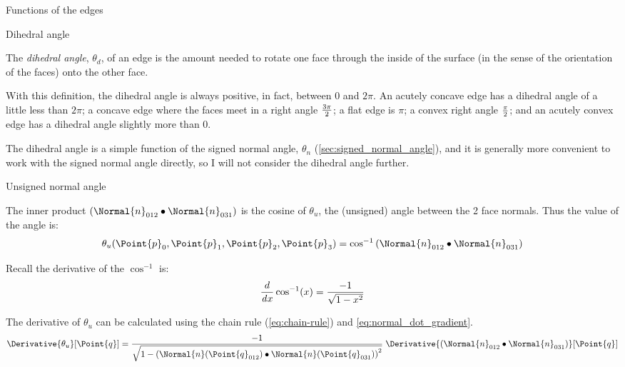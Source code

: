 \begin{plSection}{Functions of the edges}
\begin{plSection}{Dihedral angle}
\label{sec:Dihedral-angle}

The {\it dihedral angle},
$\theta_d$,
 of an edge is the amount
needed to rotate one face
through the inside of the surface
(in the sense of the orientation of the faces)
onto the other face.

With this definition, the dihedral angle is always
positive, in fact, between $0$ and $2\pi$.
An acutely concave edge has a dihedral angle
of a little less than $2\pi$;
a concave edge where the faces meet in a right angle
${3\pi} \over 2$;
a flat edge is $\pi$;
a convex right angle $\pi \over 2$;
and an acutely convex edge has a dihedral angle
slightly more than $0$.

The dihedral angle is a simple function of the
signed normal angle, $\theta_n$
(\cref{sec:signed_normal_angle}),
and it is generally more convenient to work
with the signed normal angle directly,
so I will not consider the dihedral angle further.

\end{plSection}%

\begin{plSection}{Unsigned normal angle}
\label{sec:unsigned_normal_angle}

The inner product $\left( \Normal{n}_{012} \bullet \Normal{n}_{031} \right)$
is the cosine of $\theta_u$,
the (unsigned) angle between the 2 face normals.
Thus the value of the angle is:
\begin{equation}
\theta_u(\Point{p}_0,\Point{p}_1,\Point{p}_2,\Point{p}_3)
= \cos^{-1} \left( \Normal{n}_{012} \bullet \Normal{n}_{031} \right)
\end{equation}

Recall the derivative of the $\cos^{-1}$ is:
\begin{equation}
\frac{d}{\mathit dx} \cos^{-1}(x) = { -1 \over \sqrt{1 - x^2} }
\end{equation}

The derivative of $\theta_u$ can be calculated using the chain rule
(\cref{eq:chain-rule}) and \cref{eq:normal_dot_gradient}.
\begin{equation}
\Derivative{\theta_u}[\Point{q}]
 = { -1 \over \sqrt{1 - \left( \Normal{n}(\Point{q}_{012}) \bullet \Normal{n}(\Point{q}_{031}) \right)^2} }
\; \Derivative{\left( \Normal{n}_{012} \bullet \Normal{n}_{031} \right)}[\Point{q}]
\end{equation}


\end{plSection}
\end{plSection}
